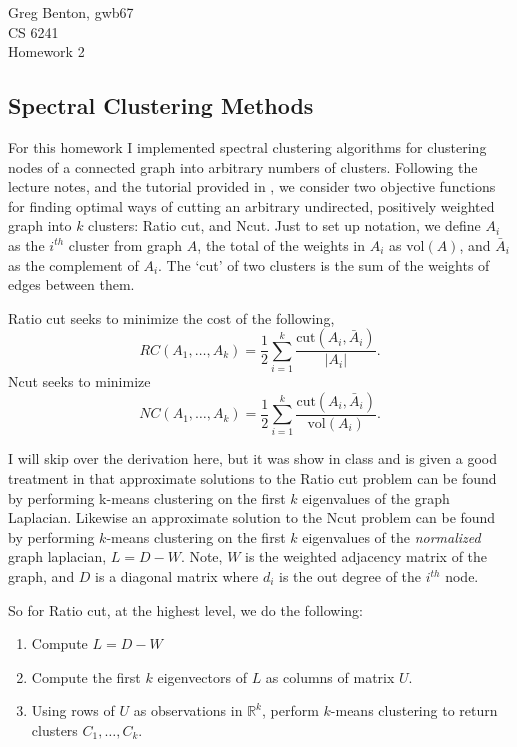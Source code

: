 \documentclass[12pt]{article} \usepackage[utf8]{inputenc}
\begin{document}
\noindent Greg Benton, gwb67\\
CS 6241\\
Homework 2\\

\subsection*{Spectral Clustering Methods}

For this homework I implemented spectral clustering algorithms for clustering nodes of a connected graph into arbitrary numbers of clusters. Following the lecture notes, and the tutorial provided in \cite{tutorial}, we consider two objective functions for finding optimal ways of cutting an arbitrary undirected, positively weighted graph into $k$ clusters: Ratio cut, and Ncut. Just to set up notation, we define $A_i$ as the $i^{th}$ cluster from graph $A$, the total of the weights in $A_i$ as $\text{vol}(A)$, and $\bar{A}_i$ as the complement of $A_i$. The `cut' of two clusters is the sum of the weights of edges between them.

Ratio cut seeks to minimize the cost of the following,
$$
  RC(A_1, \dots, A_k) = \frac{1}{2}\sum_{i=1}^{k}\frac{\text{cut}(A_i, \bar{A}_i)}{|A_i|}.
$$
Ncut seeks to minimize
$$
  NC(A_1, \dots, A_k) = \frac{1}{2}\sum_{i=1}^{k}\frac{\text{cut}(A_i, \bar{A}_i)}{\text{vol}(A_i)}.
$$

I will skip over the derivation here, but it was show in class and is given a good treatment in \cite{tutorial} that approximate solutions to the Ratio cut problem can be found by performing k-means clustering on the first $k$ eigenvalues of the graph Laplacian. Likewise an approximate solution to the Ncut problem can be found by performing $k$-means clustering on the first $k$ eigenvalues of the \textit{normalized} graph laplacian, $L = D - W$. Note, $W$ is the weighted adjacency matrix of the graph, and $D$ is a diagonal matrix where $d_i$ is the out degree of the $i^{th}$ node.

So for Ratio cut, at the highest level, we do the following:
\begin{enumerate}[label=(\arabic*)]
  \item Compute $L = D - W$
  \item Compute the first $k$ eigenvectors of $L$ as columns of matrix $U$.
  \item Using rows of $U$ as observations in $\mathbb{R}^k$, perform $k$-means clustering to return clusters $C_1, \dots, C_k$.
\end{enumerate}
\end{document}
